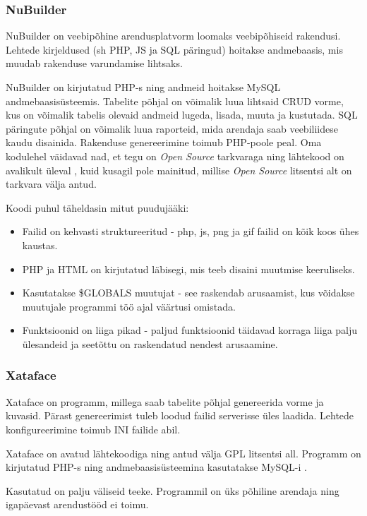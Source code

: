 \documentclass[a4paper,12pt]{article} %
\begin{document}
\subsubsection{NuBuilder}
NuBuilder on veebipõhine arendusplatvorm loomaks veebipõhiseid rakendusi. Lehtede kirjeldused (sh PHP, JS ja SQL päringud) hoitakse andmebaasis, mis muudab rakenduse varundamise lihtsaks.\par
NuBuilder on kirjutatud PHP-s ning andmeid hoitakse MySQL andmebaasisüsteemis. Tabelite põhjal on võimalik luua lihtsaid CRUD vorme, kus on võimalik tabelis olevaid andmeid lugeda, lisada, muuta ja kustutada. SQL päringute põhjal on võimalik luua raporteid, mida arendaja saab veebiliidese kaudu disainida. Rakenduse genereerimine toimub PHP-poole peal.
Oma kodulehel väidavad nad, et tegu on \textit{Open Source} tarkvaraga ning lähtekood on avalikult üleval \cite{nuBuilderGitHub}, kuid kusagil pole mainitud, millise \textit{Open Source} litsentsi alt on tarkvara välja antud.\par
Koodi puhul täheldasin mitut puudujääki:
\begin{itemize}
\item Failid on kehvasti struktureeritud - php, js, png ja gif failid on kõik koos ühes kaustas.
\item PHP ja HTML on kirjutatud läbisegi, mis teeb disaini muutmise keeruliseks.
\item Kasutatakse \$GLOBALS muutujat - see raskendab arusaamist, kus võidakse muutujale programmi töö ajal väärtusi omistada.
\item Funktsioonid on liiga pikad - paljud funktsioonid täidavad korraga liiga palju ülesandeid ja seetõttu on raskendatud nendest arusaamine.
\end{itemize}
\cite{nuBuilder}
\subsubsection{Xataface}
Xataface on programm, millega saab tabelite põhjal genereerida vorme ja kuvasid. Pärast genereerimist tuleb loodud failid serverisse üles laadida. Lehtede konfigureerimine toimub INI failide abil.\cite{Xataface}\par
Xataface on avatud lähtekoodiga ning antud välja GPL litsentsi all. Programm on kirjutatud PHP-s \cite{PHP} ning andmebaasisüsteemina kasutatakse MySQL-i \cite{MySQL}.\par
Kasutatud on palju väliseid teeke. Programmil on üks põhiline arendaja ning igapäevast arendustööd ei toimu. \cite{XatafaceGitHub}
\end{document}
